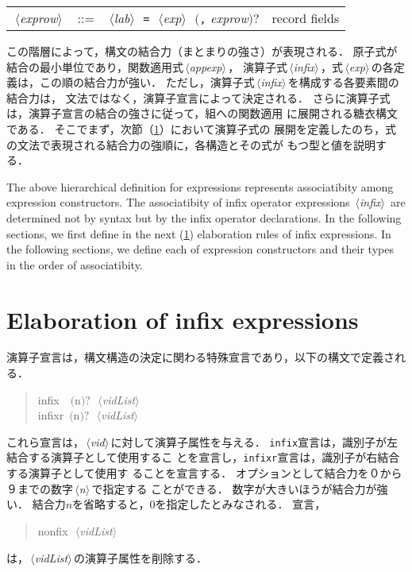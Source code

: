 \documentclass{jbook}
\newcommand{\txt}[2]{#2}
\newcommand{\code}[1]{\mbox{\large\tt #1}}
\newcommand{\nonterm}[1]{\mbox{$\,\langle$}{\it #1}\mbox{$\rangle\,$}}
\newcommand{\term}[1]{\mbox{{\tt #1}}}
\newcommand{\optional}[1]{\mbox{$($}{\protect #1}\mbox{$)?$}}
\newenvironment{program}{\begin{quote}\begin{tt}}%
                        {\end{tt}\end{quote}}
\begin{document}
\begin{itemize}
\begin{tabular}{lcll}
\nonterm{exprow}&::=& 
       \nonterm{lab}\ \term{=}\ \nonterm{exp}\ \optional{\term{,} {\it
	exprow}}
	& \txt{レコードフィールド}{record fields}\\
\end{tabular}

\end{itemize}

\ifjp%
	この階層によって，構文の結合力（まとまりの強さ）が表現される．
	原子式が結合の最小単位であり，関数適用式\nonterm{appexp}，
演算子式\nonterm{infix}，式\nonterm{exp}の各定義は，この順の結合力が強い．
	ただし，演算子式\nonterm{infix}を構成する各要素間の結合力は，
文法ではなく，演算子宣言によって決定される．
	さらに演算子式は，演算子宣言の結合の強さに従って，組への関数適用
に展開される糖衣構文である．
	そこでまず，次節（\ref{sec:reference:infix}）において演算子式の
展開を定義したのち，式の文法で表現される結合力の強順に，各構造とその式が
もつ型と値を説明する．

\else%
	The above hierarchical definition for expressions represents 
associatibity among expression constructors.
	The associatibity of infix operator expressions	
\nonterm{infix} are determined not by syntax but by the 
infix operator declarations.
	In the following sections, we first define in the next
(\ref{sec:reference:infix}) elaboration rules of infix expressions.
	In the following sections, we define each of expression
constructors and their types in the order of associatibity.
\fi%

\section{\txt{演算子式の展開}{Elaboration of infix expressions}}
\label{sec:reference:infix}

\ifjp%
	演算子宣言は，構文構造の決定に関わる特殊宣言であり，以下の構文で定義される．
\begin{program}
infix\ \ \optional{n}\ \nonterm{vidList}\\
infixr\ \optional{n}\ \nonterm{vidList}
\end{program}
	これら宣言は，\nonterm{vid}に対して演算子属性を与える．
	\code{infix}宣言は，識別子が左結合する演算子として使用するこ
とを宣言し，\code{infixr}宣言は，識別子が右結合する演算子として使用す
ることを宣言する．
	オプションとして結合力を０から９までの数字\nonterm{n}で指定する
ことができる．
	数字が大きいほうが結合力が強い．
	結合力$n$を省略すると，$0$を指定したとみなされる．
	宣言，
\begin{program}
nonfix\ \nonterm{vidList} 
\end{program}
は，\nonterm{vidList}の演算子属性を削除する．
\end{document}
